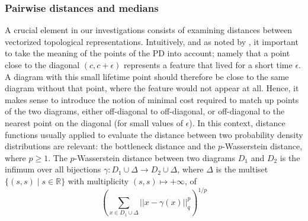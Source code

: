 \documentclass{article}
\begin{document}

\subsubsection{Pairwise distances and medians}\label{sec:pairwise_distance_definitions}

A crucial element in our investigations consists of examining distances between vectorized
topological representations. Intuitively, and as noted by
\citep{berwald2018computing}, it important to take the meaning of the points of the PD into account;
namely that a point close to the diagonal $(c,c+\epsilon)$ represents a feature that lived for a
short time $\epsilon$. A diagram with this small lifetime point should therefore be close to the
same diagram without that point, where the feature would not appear at all. Hence, it makes sense to
introduce the notion of minimal cost required to match up points of the two diagrams, either
off-diagonal to off-diagonal, or off-diagonal to the nearest point on the diagonal (for small values
of $\epsilon$). In this context, distance functions usually applied to evaluate the distance between
two probability density distributions are relevant: the bottleneck distance and the $p$-Wasserstein
distance, where $p\geq 1$. The $p$-Wasserstein distance between two diagrams $D_1$ and $D_2$ is the
infimum over all bijections $\gamma: D_1 \cup \Delta \to D_2 \cup \Delta$, where $\Delta$ is the
multiset $\lbrace (s, s) \mid s \in \mathbb{R} \rbrace$ with multiplicity $(s,s) \mapsto +\infty$,
of
\begin{equation}
  \label{eq:wasserstein_distance}
  \left(\sum_{x \in D_1 \cup \Delta} ||x - \gamma(x)||_q^p \right)^{1/p}
\end{equation}
\end{document}
